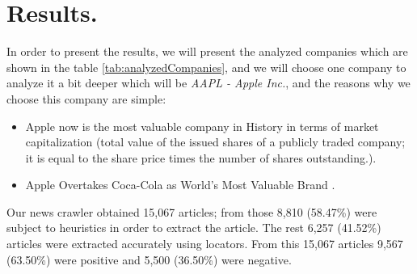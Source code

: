 \section{Results.}

In order to present the results, we will present the analyzed companies which are shown in the table \ref{tab:analyzedCompanies}, and we will choose one company to analyze it a bit deeper which will be \emph{AAPL - Apple Inc.},  and the reasons why we choose this company are simple: 
\begin{itemize}
	\item Apple now is the most valuable company in History \cite{BE2012} in terms of market capitalization (total value of the issued shares of a publicly traded company; it is equal to the share price times the number of shares outstanding.).
	\item Apple Overtakes Coca-Cola as World’s Most Valuable Brand \cite{AK2013}.
\end{itemize}
Our news crawler obtained 15,067 articles; from those 8,810 (58.47\%) were subject to heuristics in order to extract the article. The rest 6,257 (41.52\%) articles were extracted accurately using locators. From this 15,067 articles 9,567 (63.50\%) were positive and 5,500 (36.50\%) were negative.

